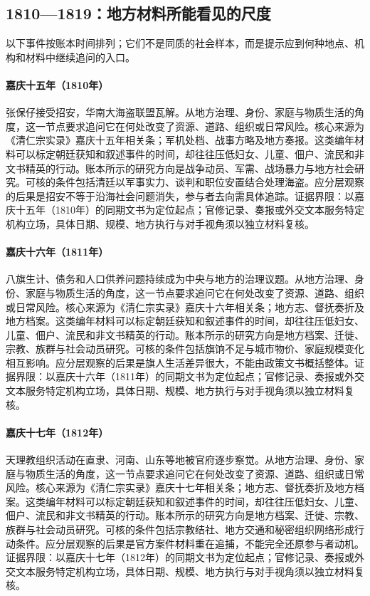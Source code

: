\subsection{1810—1819：地方材料所能看见的尺度}
以下事件按账本时间排列；它们不是同质的社会样本，而是提示应到何种地点、机构和材料中继续追问的入口。
\hypertarget{social:EQ-1810-ZHANG-BAOZAI-SURRENDER}{}\paragraph{嘉庆十五年（1810年）}张保仔接受招安，华南大海盗联盟瓦解。从地方治理、身份、家庭与物质生活的角度，这一节点要求追问它在何处改变了资源、道路、组织或日常风险。核心来源为《清仁宗实录》嘉庆十五年相关条；军机处档、战事方略及地方奏报。这类编年材料可以标定朝廷获知和叙述事件的时间，却往往压低妇女、儿童、佃户、流民和非文书精英的行动。账本所示的研究方向是战争动员、军需、战场暴力与地方社会研究。可核的条件包括清廷以军事实力、谈判和职位安置结合处理海盗。应分层观察的后果是招安不等于沿海社会问题消失，参与者去向需具体追踪。证据界限：以嘉庆十五年（1810年）的同期文书为定位起点；官修记录、奏报或外交文本服务特定机构立场，具体日期、规模、地方执行与对手视角须以独立材料复核。
\hypertarget{social:EQ-1811-BANNER-LIVELIHOOD}{}\paragraph{嘉庆十六年（1811年）}八旗生计、债务和人口供养问题持续成为中央与地方的治理议题。从地方治理、身份、家庭与物质生活的角度，这一节点要求追问它在何处改变了资源、道路、组织或日常风险。核心来源为《清仁宗实录》嘉庆十六年相关条；地方志、督抚奏折及地方档案。这类编年材料可以标定朝廷获知和叙述事件的时间，却往往压低妇女、儿童、佃户、流民和非文书精英的行动。账本所示的研究方向是地方档案、迁徙、宗教、族群与社会动员研究。可核的条件包括旗饷不足与城市物价、家庭规模变化相互影响。应分层观察的后果是旗人生活差异很大，不能由政策文书概括整体。证据界限：以嘉庆十六年（1811年）的同期文书为定位起点；官修记录、奏报或外交文本服务特定机构立场，具体日期、规模、地方执行与对手视角须以独立材料复核。
\hypertarget{social:EQ-1812-TIANLI-PREPARATION}{}\paragraph{嘉庆十七年（1812年）}天理教组织活动在直隶、河南、山东等地被官府逐步察觉。从地方治理、身份、家庭与物质生活的角度，这一节点要求追问它在何处改变了资源、道路、组织或日常风险。核心来源为《清仁宗实录》嘉庆十七年相关条；地方志、督抚奏折及地方档案。这类编年材料可以标定朝廷获知和叙述事件的时间，却往往压低妇女、儿童、佃户、流民和非文书精英的行动。账本所示的研究方向是地方档案、迁徙、宗教、族群与社会动员研究。可核的条件包括宗教结社、地方交通和秘密组织网络形成行动条件。应分层观察的后果是官方案件材料重在追捕，不能完全还原参与者动机。证据界限：以嘉庆十七年（1812年）的同期文书为定位起点；官修记录、奏报或外交文本服务特定机构立场，具体日期、规模、地方执行与对手视角须以独立材料复核。
